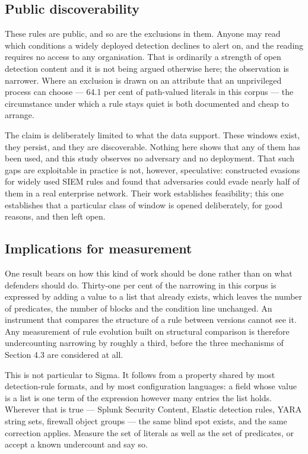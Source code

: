 \subsection{Public discoverability}

These rules are public, and so are the exclusions in them. Anyone may read which conditions a widely deployed detection declines to alert on, and the reading requires no access to any organisation. That is ordinarily a strength of open detection content and it is not being argued otherwise here; the observation is narrower. Where an exclusion is drawn on an attribute that an unprivileged process can choose --- 64.1 per cent of path-valued literals in this corpus --- the circumstance under which a rule stays quiet is both documented and cheap to arrange.

The claim is deliberately limited to what the data support. These windows exist, they persist, and they are discoverable. Nothing here shows that any of them has been used, and this study observes no adversary and no deployment. That such gaps are exploitable in practice is not, however, speculative: \citet{uetz2024} constructed evasions for widely used SIEM rules and found that adversaries could evade nearly half of them in a real enterprise network. Their work establishes feasibility; this one establishes that a particular class of window is opened deliberately, for good reasons, and then left open.

\subsection{Implications for measurement}

One result bears on how this kind of work should be done rather than on what defenders should do. Thirty-one per cent of the narrowing in this corpus is expressed by adding a value to a list that already exists, which leaves the number of predicates, the number of blocks and the condition line unchanged. An instrument that compares the structure of a rule between versions cannot see it. Any measurement of rule evolution built on structural comparison is therefore undercounting narrowing by roughly a third, before the three mechanisms of Section 4.3 are considered at all.

This is not particular to Sigma. It follows from a property shared by most detection-rule formats, and by most configuration languages: a field whose value is a list is one term of the expression however many entries the list holds. Wherever that is true --- Splunk Security Content, Elastic detection rules, YARA string sets, firewall object groups --- the same blind spot exists, and the same correction applies. Measure the set of literals as well as the set of predicates, or accept a known undercount and say so.

